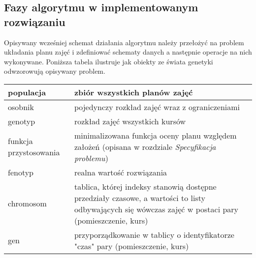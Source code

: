 \subsection{Fazy algorytmu w implementowanym rozwiązaniu}
\par Opisywany wcześniej schemat działania algorytmu należy przełożyć na problem układania planu zajęć i zdefiniować schematy danych a następnie operacje na nich wykonywane. Poniższa tabela ilustruje jak obiekty ze świata genetyki odwzorowują opisywany problem.
\begin{center}
\begin{tabular}{| l | p{10cm} |}
\hline
populacja & zbiór wszystkich planów zajęć \\ \hline
osobnik & pojedynczy rozkład zajęć wraz z ograniczeniami \\ \hline
genotyp & rozkład zajęć wszystkich kursów \\ \hline
funkcja przystosowania & minimalizowana funkcja oceny planu względem założeń (opisana w rozdziale \emph{Specyfikacja problemu}) \\ \hline
fenotyp & realna wartość rozwiązania \\ \hline
chromosom & tablica, której indeksy stanowią dostępne przedziały czasowe, a wartości to listy odbywających się wówczas zajęć w postaci pary (pomieszczenie, kurs) \\ \hline
gen & przyporządkowanie w tablicy o identyfikatorze "czas" pary  (pomieszczenie, kurs) \\ \hline
\end{tabular}
\end{center}
